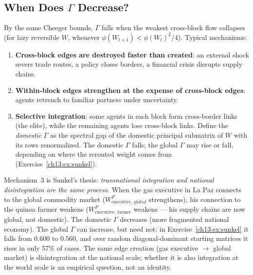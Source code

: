 \documentclass[../structural_economics_book.tex]{subfiles}
\begin{document}
\subsection{When Does $\Gamma$ Decrease?}

\begin{remark}\label{ch13:prop:disintegration}
By the same Cheeger bounds, $\Gamma$ falls when the weakest cross-block flow collapses (for lazy reversible $W$, whenever $\phi(W_{t+1}) < \phi(W_t)^2/4$). Typical mechanisms:
\begin{enumerate}
\item \textbf{Cross-block edges are destroyed faster than created}: an external shock severs trade routes, a policy closes borders, a financial crisis disrupts supply chains.
\item \textbf{Within-block edges strengthen at the expense of cross-block edges}: agents retrench to familiar partners under uncertainty.
\item \textbf{Selective integration}: some agents in each block form cross-border links (the elite), while the remaining agents lose cross-block links. Define the \emph{domestic} $\Gamma$ as the spectral gap of the domestic principal submatrix of $W$ with its rows renormalized. The domestic $\Gamma$ falls; the global $\Gamma$ may rise or fall, depending on where the rerouted weight comes from (Exercise~\ref{ch13:ex:sunkel}).
\end{enumerate}
\end{remark}

\begin{keyinsight}
Mechanism~3 is Sunkel's thesis: \textit{transnational integration and national disintegration are the same process.} When the gas executive in La Paz connects to the global commodity market ($W^P_{\text{executive, global}}$ strengthens), his connection to the quinoa farmer weakens ($W^P_{\text{executive, farmer}}$ weakens --- his supply chains are now global, not domestic). The domestic $\Gamma$ decreases (more fragmented national economy). The global $\Gamma$ can increase, but need not: in Exercise~\ref{ch13:ex:sunkel} it falls from $0.600$ to $0.560$, and over random diagonal-dominant starting matrices it rises in only 57\% of cases. The same edge creation (gas executive $\to$ global market) is disintegration at the national scale; whether it is also integration at the world scale is an empirical question, not an identity.
\end{keyinsight}
\end{document}
